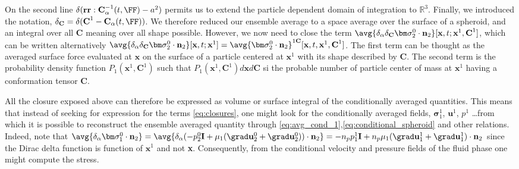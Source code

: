 On the second line $\delta(\textbf{rr}: \textbf{C}_\alpha^{-1}(t,\FF) -a^2)$ permits us to extend the particle dependent domain of integration to $\mathbb{R}^3$. 
Finally, we introduced the notation, $\delta_\textbf{C} = \delta(\textbf{C}^1 - \textbf{C}_\alpha(t,\FF))$. 
We therefore reduced our ensemble average to a space average over the surface of a spheroid, and an integral over all $\textbf{C}$ meaning over all shape possible.
However, we now need to close the term $\avg{\delta_\alpha \delta_\textbf{C} \bm\sigma_2^0\cdot \textbf{n}_2}
[\textbf{x},t;\textbf{x}^1,\textbf{C}^1]$, which can be written alternatively $\avg{\delta_\alpha \delta_\textbf{C} \bm\sigma_2^0\cdot \textbf{n}_2}
[\textbf{x},t;\textbf{x}^1] = \avg{\bm\sigma_2^0\cdot \textbf{n}_2}^{1\textbf{C}}
[\textbf{x},t,\textbf{x}^1,\textbf{C}^1]$.
The first term can be thought as the averaged surface force evaluated at $\textbf{x}$ on the surface of a particle centered at $\textbf{x}^1$ with its shape described by $\textbf{C}$.
The second term is the probability density function $P_1(\textbf{x}^1,\textbf{C}^1)$ such that $P_1(\textbf{x}^1,\textbf{C}^1)d\textbf{x}d\textbf{C}$ si the probable number of particle center of mass at $\textbf{x}^1$ having a conformation tensor $\textbf{C}$. 

All the closure exposed above can therefore be expressed as volume or surface integral of the conditionally averaged quantities.
This means that instead of seeking for expression for the terms \ref{eq:closures}, one might look for the conditionally averaged fields, $\bm\sigma^1_1$, $\textbf{u}^1$, $p^1$ \ldots from which it is possible to reconstruct the ensemble averaged quantity through \ref{eq:avg_cond_1},\ref{eq:conditional_spheroid} and other relations. 
Indeed, note that $\avg{\delta_\alpha \bm\sigma_1^0\cdot \textbf{n}_2}
= \avg{\delta_\alpha  (-p_2^0 \textbf{I} + \mu_1 (\grad \textbf{u}_2^0+\grad \textbf{u}_2^0))\cdot \textbf{n}_2}
= - n_p p_1^1 \textbf{I} + n_p \mu_1 (\grad \textbf{u}_1^1 + \grad \textbf{u}_1^1)\cdot \textbf{n}_2$ since the Dirac delta function is function of $\textbf{x}^1$ and not \textbf{x}. 
Consequently, from the conditional velocity and pressure fields of the fluid phase one might compute the stress. 


